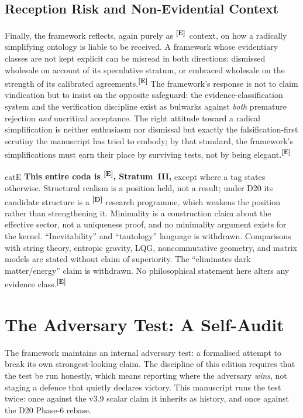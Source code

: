 \documentclass[12pt,a4paper,twoside]{article}
\theoremstyle{plain}
\theoremstyle{definition}
\theoremstyle{remark}
\newcommand{\catmark}[1]{\textsuperscript{\textsf{\textbf{[#1]}}}}
\begin{document}
\subsection{Reception Risk and Non-Evidential Context}
\label{subsec:sociology}

Finally, the framework reflects, again purely as \catmark{E}\ context, on
how a radically simplifying ontology is liable to be received. A
framework whose evidentiary classes are not kept explicit can be misread
in both directions: dismissed wholesale on account of its speculative
stratum, or embraced wholesale on the strength of its calibrated
agreements.\catmark{E} The framework's response is not to claim
vindication but to insist on the opposite safeguard: the
evidence-classification system and the verification discipline exist as
bulwarks against \emph{both} premature rejection \emph{and} uncritical
acceptance. The right attitude toward a radical simplification is neither
enthusiasm nor dismissal but exactly the falsification-first scrutiny the
manuscript has tried to embody; by that standard, the framework's
simplifications must earn their place by surviving tests, not by being
elegant.\catmark{E}

\begin{evidencebox}{catE}
\textbf{This entire coda is \catmark{E}, Stratum~III,} except where a
tag states otherwise. Structural realism is a position held, not a
result; under D20 its candidate structure is a \catmark{D} research
programme, which weakens the position rather than strengthening it.
Minimality is a construction claim about the effective sector, not a
uniqueness proof, and no minimality argument exists for the kernel.
``Inevitability'' and ``tautology'' language is withdrawn. Comparisons
with string theory, entropic gravity, LQG, noncommutative geometry, and
matrix models are stated without claim of superiority. The ``eliminates
dark matter/energy'' claim is withdrawn. No philosophical statement here
alters any evidence class.\catmark{E}
\end{evidencebox}

\newpage
\section{The Adversary Test: A Self-Audit}
\label{sec:adversary}

\noindent The framework maintains an internal adversary test: a
formalised attempt to break its own strongest-looking claim. The
discipline of this edition requires that the test be run honestly, which
means reporting where the adversary \emph{wins}, not staging a defence
that quietly declares victory. This manuscript runs the test twice: once against the v3.9 scalar claim it
inherits as history, and once against the D20 Phase-6 rebase.
\end{document}
